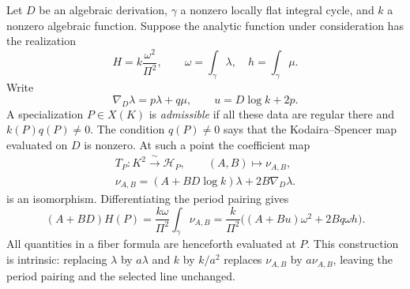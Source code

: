 Let $D$ be an algebraic derivation, $\gamma$ a nonzero locally flat
integral cycle, and $k$ a nonzero algebraic function. Suppose the
analytic function under consideration has the realization
\begin{equation}\label{eq:general-square}
 H=k\frac{\omega^2}{\Pi^2},\qquad
 \omega=\int_\gamma\lambda,\quad h=\int_\gamma\mu.
\end{equation}
Write
\begin{equation}\label{eq:general-connection}
 \nabla_D\lambda=p\lambda+q\mu,\qquad u=D\log k+2p.
\end{equation}
A specialization $P\in X(K)$ is \emph{admissible} if all these data
are regular there and $k(P)q(P)\ne0$. The condition $q(P)\ne0$ says
that the Kodaira--Spencer map evaluated on $D$ is nonzero. At such a
point the coefficient map
\begin{equation}\label{eq:general-coefficient-class}
 \begin{gathered}
 T_P:K^2\xrightarrow{\ \sim\ }\mathcal H_P,\qquad
 (A,B)\longmapsto\nu_{A,B},\\
 \nu_{A,B}=(A+B D\log k)\lambda+2B\nabla_D\lambda .
 \end{gathered}
\end{equation}
is an isomorphism. Differentiating the period pairing gives
\begin{equation}\label{eq:general-jet}
 (A+BD)H(P)
   =\frac{k\omega}{\Pi^2}\int_\gamma\nu_{A,B}
   =\frac{k}{\Pi^2}\bigl((A+Bu)\omega^2+2Bq\omega h\bigr).
\end{equation}
All quantities in a fiber formula are henceforth evaluated at $P$.
This construction is intrinsic: replacing $\lambda$ by $a\lambda$
and $k$ by $k/a^2$ replaces $\nu_{A,B}$ by $a\nu_{A,B}$, leaving the
period pairing and the selected line unchanged.

